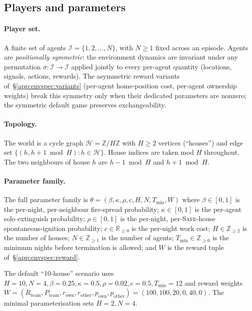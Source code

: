 \documentclass{anvil-paper}
\begin{document}
\subsection{Players and parameters}
\label{app:envspec:setup}

\paragraph{Player set.} A finite set of agents
$\mathcal{I}=\{1,2,\ldots,N\}$, with $N\geq 1$ fixed across an episode.
Agents are \emph{positionally symmetric}: the environment dynamics are
invariant under any permutation $\sigma:\mathcal{I}\to\mathcal{I}$ applied
jointly to every per-agent quantity (locations, signals, actions,
rewards). The asymmetric reward variants of~\S\ref{app:envspec:variants}
(per-agent home-position cost, per-agent ownership weights) break this
symmetry only when their dedicated parameters are nonzero; the symmetric
default game preserves exchangeability.

\paragraph{Topology.} The world is a cycle graph
$\mathcal{H}=\mathbb{Z}/H\mathbb{Z}$ with $H\geq 2$ vertices (``houses'')
and edge set $\{(h,h{+}1\bmod H):h\in\mathcal{H}\}$. House indices are
taken mod $H$ throughout. The two neighbours of house $h$ are
$h{-}1\bmod H$ and $h{+}1\bmod H$.

\paragraph{Parameter family.} The full parameter family is
$\theta=(\beta,\kappa,\rho,c,H,N,T_{\min},W)$ where $\beta\in[0,1]$ is the
per-night, per-neighbour fire-spread probability; $\kappa\in[0,1]$ is the
per-agent solo extinguish probability; $\rho\in[0,1]$ is the per-night,
per-\textsc{Safe}-house spontaneous-ignition probability; $c\in\mathbb{R}_{\geq 0}$
is the per-night work cost; $H\in\mathbb{Z}_{\geq 2}$ is the number of
houses; $N\in\mathbb{Z}_{\geq 1}$ is the number of agents;
$T_{\min}\in\mathbb{Z}_{\geq 0}$ is the minimum nights before termination
is allowed; and $W$ is the reward tuple of~\S\ref{app:envspec:reward}.

The default ``10-house'' scenario uses $H{=}10,N{=}4,\beta{=}0.25,
\kappa{=}0.5,\rho{=}0.02,c{=}0.5,T_{\min}{=}12$ and reward weights
$W=(R_{\text{team}},P_{\text{team}},r_{\text{own}},r_{\text{other}},
p_{\text{own}},p_{\text{other}})=(100,100,20,0,40,0)$. The minimal
parameterisation sets $H{=}2,N{=}4$.
\end{document}
